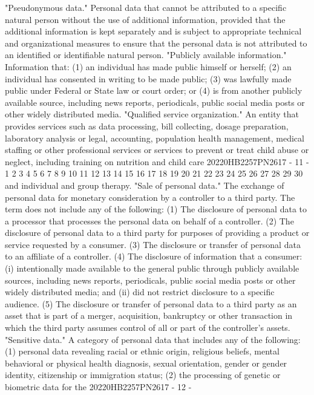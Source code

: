 "Pseudonymous data." Personal data that cannot be attributed
to a specific natural person without the use of additional
information, provided that the additional information is kept
separately and is subject to appropriate technical and
organizational measures to ensure that the personal data is not
attributed to an identified or identifiable natural person.
"Publicly available information." Information that:
(1) an individual has made public himself or herself;
(2) an individual has consented in writing to be made
public;
(3) was lawfully made public under Federal or State law
or court order; or
(4) is from another publicly available source, including
news reports, periodicals, public social media posts or other
widely distributed media.
"Qualified service organization." An entity that provides
services such as data processing, bill collecting, dosage
preparation, laboratory analysis or legal, accounting,
population health management, medical staffing or other
professional services or services to prevent or treat child
abuse or neglect, including training on nutrition and child care
20220HB2257PN2617 - 11 -
1
2
3
4
5
6
7
8
9
10
11
12
13
14
15
16
17
18
19
20
21
22
23
24
25
26
27
28
29
30
and individual and group therapy.
"Sale of personal data." The exchange of personal data for
monetary consideration by a controller to a third party. The
term does not include any of the following:
(1) The disclosure of personal data to a processor that
processes the personal data on behalf of a controller.
(2) The disclosure of personal data to a third party for
purposes of providing a product or service requested by a
consumer.
(3) The disclosure or transfer of personal data to an
affiliate of a controller.
(4) The disclosure of information that a consumer:
(i) intentionally made available to the general
public through publicly available sources, including news
reports, periodicals, public social media posts or other
widely distributed media; and
(ii) did not restrict disclosure to a specific
audience.
(5) The disclosure or transfer of personal data to a
third party as an asset that is part of a merger,
acquisition, bankruptcy or other transaction in which the
third party assumes control of all or part of the
controller's assets.
"Sensitive data." A category of personal data that includes
any of the following:
(1) personal data revealing racial or ethnic origin,
religious beliefs, mental behavioral or physical health
diagnosis, sexual orientation, gender or gender identity,
citizenship or immigration status;
(2) the processing of genetic or biometric data for the
20220HB2257PN2617 - 12 -
